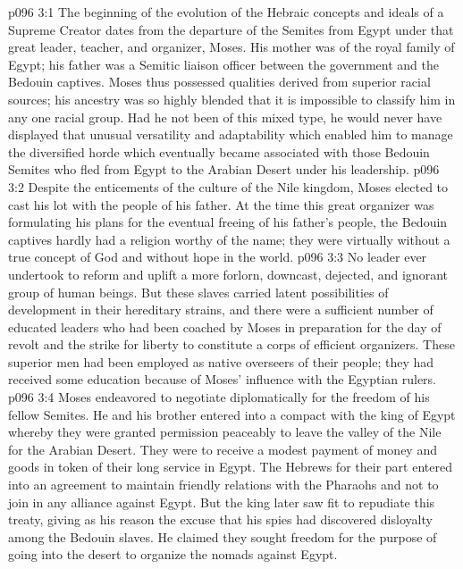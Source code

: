 \vs p096 3:1 The beginning of the evolution of the Hebraic concepts and ideals of a Supreme Creator dates from the departure of the Semites from Egypt under that great leader, teacher, and organizer, Moses. His mother was of the royal family of Egypt; his father was a Semitic liaison officer between the government and the Bedouin captives. Moses thus possessed qualities derived from superior racial sources; his ancestry was so highly blended that it is impossible to classify him in any one racial group. Had he not been of this mixed type, he would never have displayed that unusual versatility and adaptability which enabled him to manage the diversified horde which eventually became associated with those Bedouin Semites who fled from Egypt to the Arabian Desert under his leadership.
\vs p096 3:2 Despite the enticements of the culture of the Nile kingdom, Moses elected to cast his lot with the people of his father. At the time this great organizer was formulating his plans for the eventual freeing of his father’s people, the Bedouin captives hardly had a religion worthy of the name; they were virtually without a true concept of God and without hope in the world.
\vs p096 3:3 \pc No leader ever undertook to reform and uplift a more forlorn, downcast, dejected, and ignorant group of human beings. But these slaves carried latent possibilities of development in their hereditary strains, and there were a sufficient number of educated leaders who had been coached by Moses in preparation for the day of revolt and the strike for liberty to constitute a corps of efficient organizers. These superior men had been employed as native overseers of their people; they had received some education because of Moses’ influence with the Egyptian rulers.
\vs p096 3:4 Moses endeavored to negotiate diplomatically for the freedom of his fellow Semites. He and his brother entered into a compact with the king of Egypt whereby they were granted permission peaceably to leave the valley of the Nile for the Arabian Desert. They were to receive a modest payment of money and goods in token of their long service in Egypt. The Hebrews for their part entered into an agreement to maintain friendly relations with the Pharaohs and not to join in any alliance against Egypt. But the king later saw fit to repudiate this treaty, giving as his reason the excuse that his spies had discovered disloyalty among the Bedouin slaves. He claimed they sought freedom for the purpose of going into the desert to organize the nomads against Egypt.
